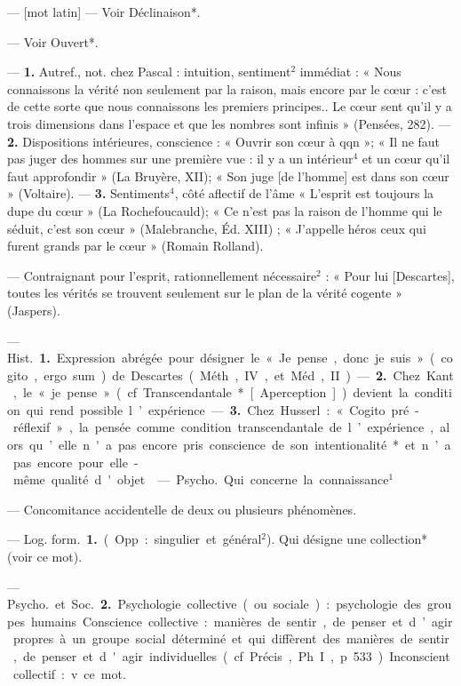 \begin{itemize}[leftmargin=1cm, label=, itemsep=11pt]
 — [mot latin] — Voir Déclinaison*.

 — Voir Ouvert*.

 — {\bf 1.} Autref., not. chez Pascal :
intuition, sentiment$^2$ immédiat :
« Nous connaissons la vérité non
seulement par la raison, mais encore
par le cœur : c’est de cette sorte que
nous connaissons les premiers principes.. Le cœur sent qu’il y a trois
dimensions dans l’espace et que les
nombres sont infinis » (Pensées, 282).
—  {\bf 2.} Dispositions intérieures, conscience : « Ouvrir son cœur à qqn »;
« Il ne faut pas juger des hommes
sur une première vue : il y a un
intérieur$^4$ et un cœur qu'il faut
approfondir » (La Bruyère, XII);
« Son juge [de l'homme] est dans
son cœur » (Voltaire). —  {\bf 3.} Sentiments$^4$, côté aflectif de l'âme
« L'esprit est toujours la dupe du
cœur » (La Rochefoucauld); « Ce
n'est pas la raison de l’homme qui
le séduit, c’est son cœur » (Malebranche, Éd. XIII) ; « J’appelle héros
ceux qui furent grands par le cœur »
(Romain Rolland).

 — Contraignant pour l'esprit,
rationnellement nécessaire$^2$ : « Pour
lui [Descartes], toutes les vérités se
trouvent seulement sur le plan de la
vérité cogente » (Jaspers).
%

 — \si{Hist.} {\bf 1.} Expression abrégée
pour désigner le « Je pense, donc je
suis » (cogito, ergo sum) de Descartes
(Méth., IV, et Méd., II). —  {\bf 2.} Chez
Kant, le « je pense » (cf. Transcendantale* [Aperception]) devient la
condition qui rend possible l’expérience. —  {\bf 3.} Chez Husserl : « Cogito
pré-réflexif », la pensée comme condition transcendantale de l’expérience, alors qu’elle n'a pas encore
pris conscience de son intentionalité*
et n’a pas encore pour elle-même
qualité d'objet.

 — \si{Psycho.} Qui concerne la
connaissance$^1$

 — Concomitance accidentelle de deux ou plusieurs phénomènes.

 — \si{Log. form.} {\bf 1.} (Opp. : singulier et général$^2$). Qui désigne une
collection* (voir ce mot).

— \si{Psycho.} et \si{Soc.}  {\bf 2.} Psychologie
collective (ou sociale) : psychologie
des groupes humains. Conscience
collective : manières de sentir, de
penser et d’agir propres à un groupe
social déterminé et qui diffèrent des
manières de sentir, de penser et
d'agir individuelles (cf. Précis, Ph. I,
p. 533). Inconscient collectif : v. ce
mot.


\end{itemize}
